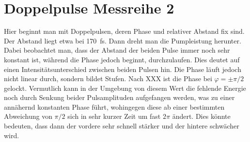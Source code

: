 \documentclass[bachelor,       %
               twoside,        %
               BCOR10mm,       %
               english,ngerman, %
               ]{GAUBM}
\begin{document}
\section{Doppelpulse Messreihe 2}
Hier beginnt man mit Doppelpulsen, deren Phase und relativer Abstand fix sind.
Der Abstand liegt etwa bei 170 \,fs.
Dann dreht man die Pumpleistung herunter.
Dabei beobachtet man, dass der Abstand der beiden Pulse immer noch sehr konstant ist, während die Phase jedoch beginnt, durchzulaufen.
Dies deutet auf einen Intensitätsunterschied zwischen beiden Pulsen hin.
Die Phase läuft jedoch nicht linear durch, sondern bildet Stufen.
Nach XXX ist die Phase bei $\varphi=\pm\pi/2$ gelockt.
Vermutlich kann in der Umgebung von diesem Wert die fehlende Energie noch durch Senkung beider Pulsamplituden aufgefangen werden, was zu einer annähernd konstanten Phase führt, wohingegen diese ab einer bestimmten Abweichung von $\pi/2$ sich in sehr kurzer Zeit um fast $2\pi$ ändert.
Dies könnte bedeuten, dass dann der vordere sehr schnell stärker und der hintere schwächer wird. 
\end{document}
